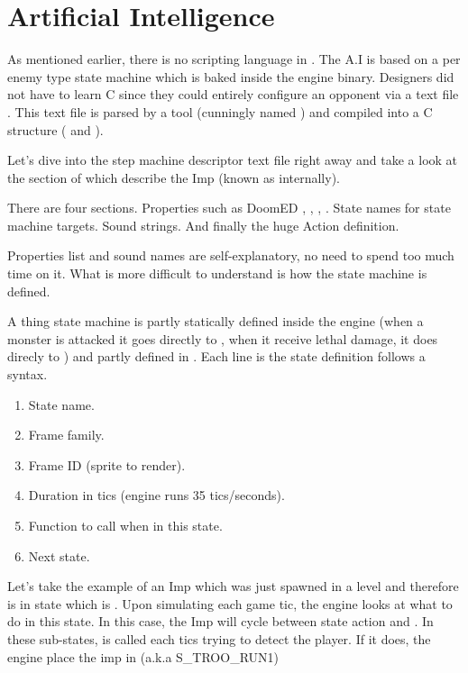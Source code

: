 \section{Artificial Intelligence}
As mentioned earlier, there is no scripting language in \doom. The A.I is based on a per enemy type state machine which is baked inside the engine binary. Designers did not have to learn C since they could entirely configure an opponent via a text file . This text file is parsed by a tool (cunningly named ) and compiled into a C structure ( and ).\\
\par
{}
\par
Let's dive into the step machine descriptor text file right away and take a look at the section of   which describe the Imp (known as  internally).\\
\par
{}


There are four sections. Properties such as DoomED , , , . State names for state machine targets. Sound strings. And finally the huge Action definition.






Properties list and sound names are self-explanatory, no need to spend too much time on it. What is more difficult to understand is how the state machine is defined.\\
\par
A thing state machine is partly statically defined inside the engine (when a monster is attacked it goes directly to , when it receive lethal damage, it does direcly to ) and partly defined in . Each line is the state definition follows a syntax.
\begin{enumerate}
\item State name.
\item Frame family.
\item Frame ID (sprite to render).
\item Duration in tics (engine runs 35 tics/seconds).
\item Function to call when in this state.
\item Next state.
\end{enumerate}
\par
Let's take the example of an Imp which was just spawned in a level and therefore is in state  which is . Upon simulating each game tic, the engine looks at what to do in this state. In this case, the Imp will cycle between state action  and . In these sub-states,  is called each tics trying to detect the player. If it does, the engine place the imp in  (a.k.a S\_TROO\_RUN1)\\
\par

